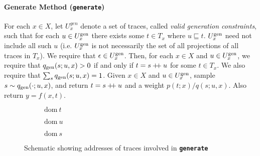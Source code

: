 \documentclass{article}
\newcommand{\code}[1]{\texttt{\small{\textbf{#1}}}}
\newcommand\doubleplus{\mathbin{+\mkern-5mu+}}
\newcommand{\concat}[0]{\doubleplus}
\newcommand{\dom}[1]{\mbox{dom}{~#1}}
\newcommand{\emptytrace}[0]{\epsilon}
\newcommand{\gen}[0]{\mbox{\scriptsize gen}}
\newcommand{\contained}[0]{\sqsubseteq}
\begin{document}

\paragraph{Generate Method (\code{generate})}
For each $x \in X$, let $U^{gen}_x$ denote a set of traces, called \emph{valid generation constraints}, such that for each $u \in U^{\gen}_x$ there exists some $t \in T_x$ where $u \contained t$.
$U^{\gen}_x$ need not include all such $u$ (i.e. $U^{\gen}_x$ is not necessarily the set of all projections of all traces in $T_x$).
We require that $\emptytrace \in U^{\gen}_x$.
Then, for each $x \in X$ and $u \in U^{\gen}_x$, we require that $q_{\gen}(s; u, x) > 0$ if and only if $t = s \concat u$ for some $t \in T_x$.
We also require that $\sum_s q_{\gen}(s; u, x) = 1$.
Given $x \in X$ and $u \in U^{\gen}_x$, sample $s \sim q_{\gen}(\cdot; u, x)$, and return $t = s \concat u$ and a weight $p(t; x) / q(s; u, x)$.
Also return $y = f(x, t)$.

\begin{figure}[t]
\centering
\begin{subfigure}[b]{0.3\textwidth}
\centering
{}
\caption{$\dom{t}$}
\end{subfigure}%
\begin{subfigure}[b]{0.3\textwidth}
\centering
{}
\caption{$\dom{u}$}
\end{subfigure}
\begin{subfigure}[b]{0.3\textwidth}
\centering
{}
\caption{$\dom{s}$}
\end{subfigure}
\caption{Schematic showing addresses of traces involved in \code{generate}}
\end{figure}
\end{document}
